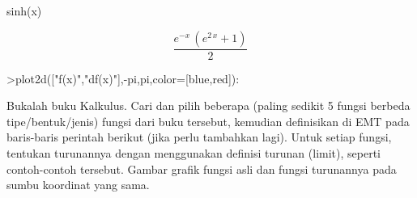 \documentclass[a4paper,10pt]{article}
\begin{document}
\begin{eulernotebook}
\begin{eulercomment}
\begin{eulercomment}
\begin{euleroutput}
                                 sinh(x)
  
\end{euleroutput}
\begin{eulerformula}
\[
\frac{e^ {- x }\,\left(e^{2\,x}+1\right)}{2}
\]
\end{eulerformula}
\begin{eulerprompt}
>plot2d(["f(x)","df(x)"],-pi,pi,color=[blue,red]):
\end{eulerprompt}
\begin{eulercomment}
Bukalah buku Kalkulus. Cari dan pilih beberapa (paling sedikit 5
fungsi berbeda tipe/bentuk/jenis) fungsi dari buku tersebut, kemudian
definisikan di EMT pada baris-baris perintah berikut (jika perlu
tambahkan lagi). Untuk setiap fungsi, tentukan turunannya dengan
menggunakan definisi turunan (limit), seperti contoh-contoh tersebut.
Gambar grafik fungsi asli dan fungsi turunannya pada sumbu koordinat
yang sama.


\end{eulercomment}
\end{eulercomment}
\end{eulercomment}
\end{eulernotebook}
\end{document}
